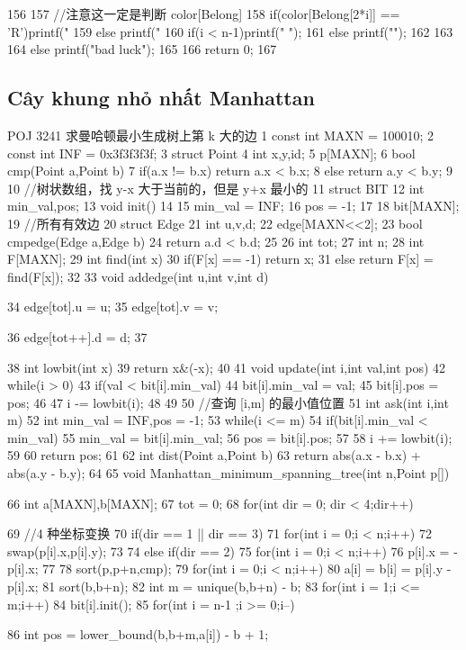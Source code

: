 \documentclass[11pt]{article}
\begin{document}
\begin{Code}
{{{156                 {
157                     //注意这一定是判断 color[Belong]
158                     if(color[Belong[2*i]] == 'R')printf("%
159                     else printf("%
160                     if(i < n-1)printf(" ");
161                     else printf("\n");
162                 }
163             }
164             else printf("bad luck\n");
165      }
166      return 0;
167 }
\end{Code}

\subsection{Cây khung nhỏ nhất Manhattan}

\begin{Code}
     POJ 3241 求曼哈顿最小生成树上第 k 大的边
 1   const int MAXN = 100010;
 2   const int INF = 0x3f3f3f3f;
 3   struct Point{
 4       int x,y,id;
 5   }p[MAXN];
 6   bool cmp(Point a,Point b){
 7       if(a.x != b.x) return a.x < b.x;
 8       else return a.y < b.y;
 9   }
10   //树状数组，找 y-x 大于当前的，但是 y+x 最小的
11   struct BIT{
12       int min_val,pos;
13       void init()
14       {
15           min_val = INF;
16           pos = -1;
17       }
18   }bit[MAXN];
19   //所有有效边
20   struct Edge{
21       int u,v,d;
22   }edge[MAXN<<2];
23   bool cmpedge(Edge a,Edge b){
24       return a.d < b.d;
25   }
26   int tot;
27   int n;
28   int F[MAXN];
29   int find(int x){
30       if(F[x] == -1) return x;
31       else return F[x] = find(F[x]);
32   }
33   void addedge(int u,int v,int d){
34       edge[tot].u = u;
35       edge[tot].v = v;


36       edge[tot++].d = d;
37   }
38   int lowbit(int x){
39       return x&(-x);
40   }
41   void update(int i,int val,int pos){
42       while(i > 0){
43           if(val < bit[i].min_val){
44                bit[i].min_val = val;
45                bit[i].pos = pos;
46           }
47           i -= lowbit(i);
48       }
49   }
50   //查询 [i,m] 的最小值位置
51   int ask(int i,int m){
52       int min_val = INF,pos = -1;
53       while(i <= m){
54           if(bit[i].min_val < min_val){
55                min_val = bit[i].min_val;
56                pos = bit[i].pos;
57           }
58           i += lowbit(i);
59       }
60       return pos;
61   }
62   int dist(Point a,Point b){
63       return abs(a.x - b.x) + abs(a.y - b.y);
64   }
65   void Manhattan_minimum_spanning_tree(int n,Point p[]){
66       int a[MAXN],b[MAXN];
67       tot = 0;
68       for(int dir = 0; dir < 4;dir++){
69           //4 种坐标变换
70           if(dir == 1 || dir == 3){
71                for(int i = 0;i < n;i++)
72                    swap(p[i].x,p[i].y);
73           }
74           else if(dir == 2){
75                for(int i = 0;i < n;i++)
76                    p[i].x = -p[i].x;
77           }
78           sort(p,p+n,cmp);
79           for(int i = 0;i < n;i++)
80                a[i] = b[i] = p[i].y - p[i].x;
81           sort(b,b+n);
82           int m = unique(b,b+n) - b;
83           for(int i = 1;i <= m;i++)
84                bit[i].init();
85           for(int i = n-1 ;i >= 0;i--){
86                int pos = lower_bound(b,b+m,a[i]) - b + 1;


}}}
\end{Code}
\end{document}
